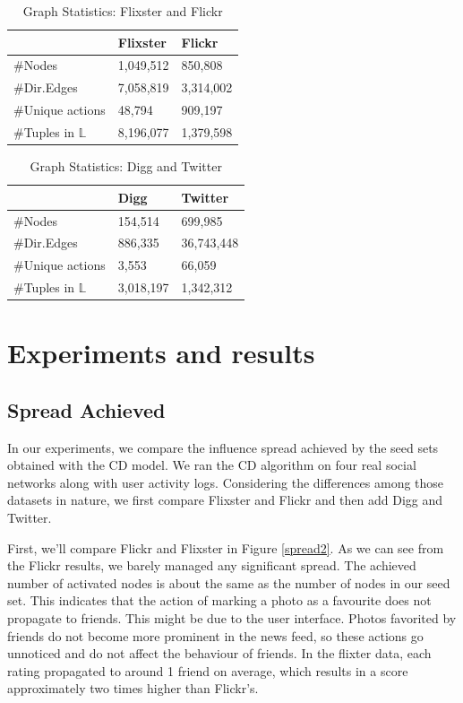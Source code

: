 \documentclass{acm_proc_article-sp}
\begin{document}
\begin{table}[]
	\centering
	\caption{Graph Statistics: Flixster and Flickr}
	\label{flixster-flickr-table}
	\begin{tabular}{|l|l|l|}
		\hline
		& Flixster  & Flickr \\ \hline
		\#Nodes         & 1,049,512 & 850,808   \\ \hline
		\#Dir.Edges     & 7,058,819 & 3,314,002   \\ \hline
		\#Unique actions     & 48,794    & 909,197    \\ \hline
		\#Tuples in $\mathbb{L}$ & 8,196,077 & 1,379,598  \\ \hline
	\end{tabular}
\end{table}


\begin{table}[]
	\centering
	\caption{Graph Statistics: Digg and Twitter}
	\label{twitter-digg-table}
	\begin{tabular}{|l|l|l|}
		\hline
		&  Digg      & Twitter    \\ \hline
		\#Nodes        & 154,514   & 699,985    \\ \hline
		\#Dir.Edges    & 886,335   & 36,743,448 \\ \hline
		\#Unique actions    & 3,553     & 66,059     \\ \hline
		\#Tuples in $\mathbb{L}$ & 3,018,197 & 1,342,312  \\ \hline
	\end{tabular}
\end{table}


\section{Experiments and results}

\subsection*{Spread Achieved}
In our experiments, we compare the influence spread achieved by the seed sets obtained with the CD model. We ran the CD algorithm on four real social networks along with user activity logs. Considering the differences among those datasets in nature, we first compare Flixster and Flickr and then add Digg and Twitter.

First, we'll compare Flickr and Flixster in Figure \ref{spread2}. As we can see from the Flickr results, we barely managed any significant spread. The achieved number of activated nodes is about the same as the number of nodes in our seed set. This indicates that the action of marking a photo as a favourite does not propagate to friends. This might be due to the user interface. Photos favorited by friends do not become more prominent in the news feed, so these actions go unnoticed and do not affect the behaviour of friends. In the flixter data, each rating propagated to around 1 friend on average, which results in a score approximately two times higher than Flickr's.
\end{document}
